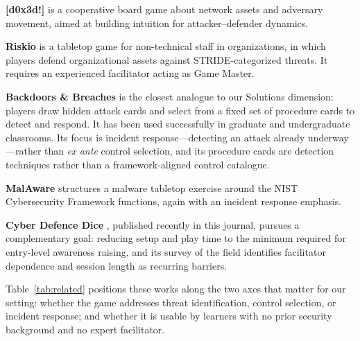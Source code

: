 \documentclass[10pt,twocolumn,letterpaper]{article}
\begin{document}
\textbf{[d0x3d!]} \cite{gondree2013d0x3d} is a cooperative board game about
network assets and adversary movement, aimed at building intuition for
attacker--defender dynamics.

\textbf{Riskio} \cite{hart2020riskio} is a tabletop game for non-technical
staff in organizations, in which players defend organizational assets against
STRIDE-categorized threats. It requires an experienced facilitator acting as
Game Master.

\textbf{Backdoors \& Breaches} \cite{bhis2019backdoors} is the closest analogue
to our Solutions dimension: players draw hidden attack cards and select from a
fixed set of procedure cards to detect and respond. It has been used
successfully in graduate and undergraduate classrooms. Its focus is incident
response---detecting an attack already underway---rather than \emph{ex ante}
control selection, and its procedure cards are detection techniques rather than
a framework-aligned control catalogue.

\textbf{MalAware} \cite{malaware2024} structures a malware tabletop exercise
around the NIST Cybersecurity Framework functions, again with an incident
response emphasis.

\textbf{Cyber Defence Dice} \cite{cyberdefencedice2026}, published recently in
this journal, pursues a complementary goal: reducing setup and play time to the
minimum required for entry-level awareness raising, and its survey of the field
identifies facilitator dependence and session length as recurring barriers.

Table~\ref{tab:related} positions these works along the two axes that matter
for our setting: whether the game addresses threat identification, control
selection, or incident response; and whether it is usable by learners with no
prior security background and no expert facilitator.
\end{document}

